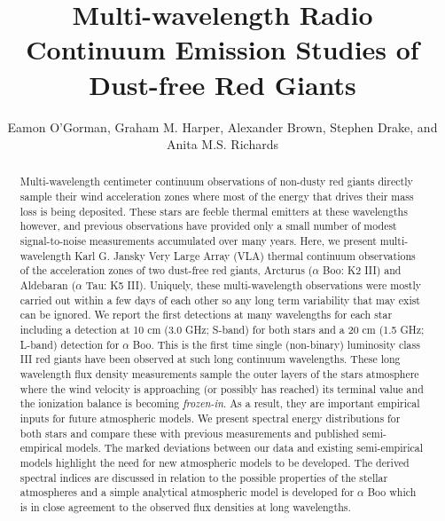 \documentclass[iop]{emulateapj}
\begin{document}
\title{Multi-wavelength Radio Continuum Emission Studies of Dust-free Red Giants}


\author{Eamon O'Gorman, Graham M. Harper, Alexander Brown, Stephen Drake, and Anita M.S. Richards}


\begin{abstract}

Multi-wavelength centimeter continuum observations of non-dusty red giants directly sample their wind acceleration zones where most of the energy that drives their mass loss is being deposited. These stars are feeble thermal emitters at these wavelengths however, and previous observations have provided only a small number of modest signal-to-noise measurements accumulated over many years. Here, we present multi-wavelength Karl G. Jansky Very Large Array (VLA) thermal continuum observations of the acceleration zones of two dust-free red giants, Arcturus ($\alpha$ Boo: K2 III) and Aldebaran ($\alpha$ Tau: K5 III). Uniquely, these multi-wavelength observations were mostly carried out within a few days of each other so any long term variability that may exist can be ignored. We report the first detections at many wavelengths for each star including a detection at 10 cm (3.0 GHz; S-band) for both stars and a 20 cm (1.5 GHz; L-band) detection for $\alpha$ Boo. This is the first time single (non-binary) luminosity class III red giants have been observed at such long continuum wavelengths. These long wavelength flux density measurements sample the outer layers of the stars atmosphere where the wind velocity is approaching (or possibly has reached) its terminal value and the ionization balance is becoming \textit{frozen-in}. As a result, they are important empirical inputs for future atmospheric models. We present spectral energy distributions for both stars and compare these with previous measurements and published semi-empirical models. The marked deviations between our data and existing semi-empirical models highlight the need for new atmospheric models to be developed. The derived spectral indices are discussed in relation to the possible properties of the stellar atmospheres and a simple analytical atmospheric model is developed for $\alpha$ Boo which is in close agreement to the observed flux densities at long wavelengths.

\end{abstract}
\end{document}
